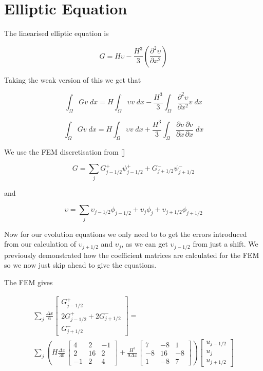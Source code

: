 \documentclass[12pt]{article}
\begin{document}
\section{Elliptic Equation}
The linearised elliptic equation is

\[G = H\upsilon -\frac{H^3}{3} \left(\frac{\partial^2 \upsilon}{\partial x^2}\right)\]

Taking the weak version of this we get that

\[\int_{\Omega}G  v \; dx = H \int_{\Omega} \upsilon v \; dx -\frac{H^3}{3}  \int_{\Omega} \frac{\partial^2 \upsilon}{\partial x^2} v \; dx\]

\[\int_{\Omega}G  v \; dx = H \int_{\Omega} \upsilon v \; dx  + \frac{H^3}{3}  \int_{\Omega} \frac{\partial \upsilon}{\partial x} \frac{\partial v}{\partial x} \; dx\]


We use the FEM discretisation from []

\begin{equation*}
G = \sum_j G^+_{j-1/2}\psi^+_{j-1/2}  + G^-_{j+1/2}\psi^-_{j+1/2}
\end{equation*}

and

\begin{equation}
\upsilon = \sum_j \upsilon_{j-1/2}\phi_{j-1/2} + \upsilon_{j}\phi_{j} + \upsilon_{j+1/2}\phi_{j+1/2}
\end{equation}

Now for our evolution equations we only need to to get the errors introduced from our calculation of $\upsilon_{j+1/2}$ and $\upsilon_{j}$, as we can get $\upsilon_{j-1/2}$ from just a shift. We previously demonstrated how the coefficient matrices are calculated for the FEM so we now just skip ahead to give the equations. 

The FEM gives

\begin{multline}
\sum_j \frac{\Delta x}{6}\begin{bmatrix} G^+_{j -1/2} \\2 G^+_{j -1/2}+2 G^-_{j +1/2} \\ G^-_{j +1/2} \end{bmatrix} = \\\sum_j \left(H\frac{\Delta x}{30}\begin{bmatrix} 4 &2 &-1 \\2 &16 &2  \\-1 &2 &4 \end{bmatrix} + \frac{H^3 }{9\Delta x}\begin{bmatrix} 7 &-8 &1  \\-8 &16 &-8  \\1 &-8 &7  \end{bmatrix} \right) \begin{bmatrix} u_{j -1/2} \\u_{j} \\ u_{j +1/2} \end{bmatrix}
\end{multline}
\end{document}
